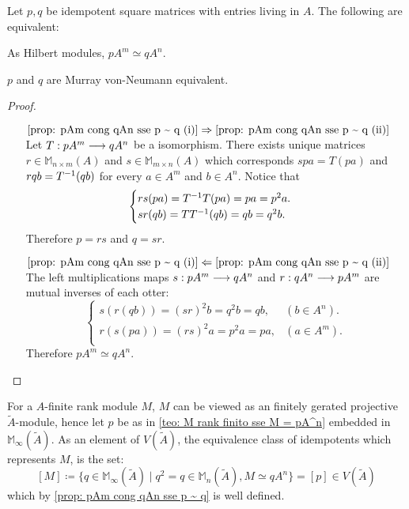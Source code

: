 \begin{lema}\label{prop: pAm cong qAn sse p ~ q}
Let $p, q$ be idempotent square matrices with entries living in $A$. The following are equivalent:
\begin{itroman}
    \item\label{prop: pAm cong qAn sse p ~ q (i)} As Hilbert modules, $pA^m \simeq q A^n$.
    \item\label{prop: pAm cong qAn sse p ~ q (ii)} $p$ and $q$ are Murray von-Neumann equivalent.
\end{itroman}
\begin{proof}
$\left.\right.$
\begin{itemize}
    \item[$\ref{prop: pAm cong qAn sse p ~ q (i)} \Rightarrow \ref{prop: pAm cong qAn sse p ~ q (ii)}$] Let $T: pA^m \longrightarrow qA^n$ be a isomorphism. There exists unique matrices $r \in \mathbb M_{n \times m}(A)$ and $s\in \mathbb M_{m \times n}(A)$ which corresponds $spa = T(pa)$ and $rqb = {T}^{-1}(qb)$ for every $a\in A^m$ and $b\in A^n$. Notice that
    \[
    \begin{cases}
        rs(pa) = {T}^{-1}T(pa) = pa = p^2a.\\
    sr(qb) = T{T}^{-1}(qb) = qb = q^2b.
    \end{cases} 
    \]
    Therefore $p = rs$ and $q = sr$.
    \item[$\ref{prop: pAm cong qAn sse p ~ q (i)} \Leftarrow \ref{prop: pAm cong qAn sse p ~ q (ii)}$] The left multiplications maps $s:pA^m \longrightarrow qA^n$ and $r: qA^n \longrightarrow pA^m$ are mutual inverses of each otter:
    \[
    \begin{cases}
    s(r(qb)) = (sr)^2b = q^2b = qb, & (b \in A^n).\\
    r(s(pa)) = (rs)^2a = p^2a = pa, & (a \in A^m).\\
    \end{cases}
    \]
    Therefore $ pA^m \simeq qA^n $. \qedhere
\end{itemize}
\end{proof}
\end{lema}


For a $A$-finite rank module $M$, $M$ can be viewed as an finitely gerated projective $\widetilde A$-module, hence let $p$ be as in \ref{teo: M rank finito sse M = pA^n} embedded in $\mathbb M_{\infty}({\widetilde{A}})$. As an element of $V({\widetilde{A}})$, the equivalence class of idempotents which represents $M$, is the set:
\[
[M] \coloneqq  \{q \in \mathbb M_\infty({\widetilde{A}}) \mid q^2 = q \in \mathbb M_{n}({\widetilde{A}}), M \simeq q A^n\} = [p] \in V({\widetilde{A}})
\]
which by \ref{prop: pAm cong qAn sse p ~ q} is well defined.

